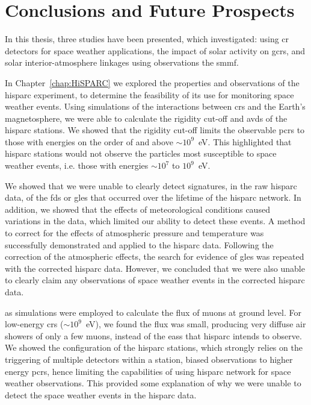 \chapter{Conclusions and Future Prospects}\label{chap:conc}

In this thesis, three studies have been presented, which investigated: using \gls{cr} detectors for space weather applications, the impact of solar activity on \glspl{gcr}, and solar interior-atmosphere linkages using observations the \gls{smmf}. %

In Chapter~\ref{chap:HiSPARC} we explored the properties and observations of the \gls{hisparc} experiment, to determine the feasibility of its use for monitoring space weather events. Using simulations of the interactions between \glspl{cr} and the Earth's magnetosphere, we were able to calculate the rigidity cut-off and \glspl{avd} of the \gls{hisparc} stations. We showed that the rigidity cut-off limits the observable \glspl{pcr} to those with energies on the order of and above $\sim$$10^9$~eV. This highlighted that \gls{hisparc} stations would not observe the particles most susceptible to space weather events, i.e. those with energies $\sim$$10^7$ to $10^9$~eV.

We showed that we were unable to clearly detect signatures, in the raw \gls{hisparc} data, of the \glspl{fd} or \glspl{gle} that occurred over the lifetime of the \gls{hisparc} network. In addition, we showed that the effects of meteorological conditions caused variations in the data, which limited our ability to detect these events. A method to correct for the effects of atmospheric pressure and temperature was successfully demonstrated and applied to the \gls{hisparc} data. Following the correction of the atmospheric effects, the search for evidence of \glspl{gle} was repeated with the corrected \gls{hisparc} data. However, we concluded that we were also unable to clearly claim any observations of space weather events in the corrected \gls{hisparc} data.

\gls{as} simulations were employed to calculate the flux of muons at ground level. For low-energy \glspl{cr} ($\sim$$10^9$~eV), we found the flux was small, producing very diffuse air showers of only a few muons, instead of the \glspl{eas} that \gls{hisparc} intends to observe. We showed the configuration of the \gls{hisparc} stations, which strongly relies on the triggering of multiple detectors within a station, biased observations to higher energy \glspl{pcr}, hence limiting the capabilities of using \gls{hisparc} network for space weather observations. This provided some explanation of why we were unable to detect the space weather events in the \gls{hisparc} data.

